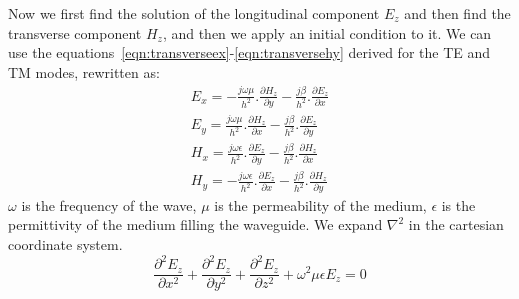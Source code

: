 Now we first find the solution of the longitudinal component $ E_{z} $ and then find the transverse component $ H_{z} $, and then we apply an initial condition to it. We can use the equations~\ref{eqn:transverseex}-\ref{eqn:transversehy} derived for the TE and TM modes, rewritten as:
\begin{align}
E_x = -\frac{j\omega\mu}{h^2}.\frac{\partial H_z}{\partial y} - \frac{j\beta}{h^2}.\frac{\partial E_z}{\partial x}
\label{eqn:transverseex2}\\
E_y = \frac{j\omega\mu}{h^2}.\frac{\partial H_z}{\partial x} - \frac{j\beta}{h^2}.\frac{\partial E_z}{\partial y}
\label{eqn:transverseey2}\\
H_x = \frac{j\omega\epsilon}{h^2}.\frac{\partial E_z}{\partial y} - \frac{j\beta}{h^2}.\frac{\partial H_z}{\partial x}
\label{eqn:transversehx2}\\
H_y = -\frac{j\omega\epsilon}{h^2}.\frac{\partial E_z}{\partial x} - \frac{j\beta}{h^2}.\frac{\partial H_z}{\partial y}
\label{eqn:transversehy2}
\end{align}
$ \omega $  is the frequency of the wave, $ \mu $   is the permeability of the medium, $ \epsilon $ is the permittivity of the medium filling the waveguide. We expand $ \nabla^{2} $ in the cartesian coordinate system.
\begin{equation}
\frac{\partial ^{2} E_z}{\partial x^2} + \frac{\partial ^2 E_z}{\partial y^2} + \frac{\partial ^2 E_z}{\partial z^2}+ \omega^2\mu\epsilon {E_{z}} = 0
\label{eqn:maxwellele}
\end{equation}

